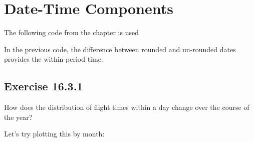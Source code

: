 \documentclass[]{book}
\newenvironment{Shaded}{\begin{snugshade}}{\end{snugshade}}
\newcommand{\DataTypeTok}[1]{\textcolor[rgb]{0.13,0.29,0.53}{#1}}
\newcommand{\DecValTok}[1]{\textcolor[rgb]{0.00,0.00,0.81}{#1}}
\newcommand{\KeywordTok}[1]{\textcolor[rgb]{0.13,0.29,0.53}{\textbf{#1}}}
\newcommand{\NormalTok}[1]{#1}
\newcommand{\OperatorTok}[1]{\textcolor[rgb]{0.81,0.36,0.00}{\textbf{#1}}}
\newcommand{\OtherTok}[1]{\textcolor[rgb]{0.56,0.35,0.01}{#1}}
\newcommand{\StringTok}[1]{\textcolor[rgb]{0.31,0.60,0.02}{#1}}
\theoremstyle{plain}
\theoremstyle{remark}
\theoremstyle{definition}
\theoremstyle{definition}
\theoremstyle{definition}
\theoremstyle{remark}
\begin{document}
\hypertarget{date-time-components}{%
\section{Date-Time Components}\label{date-time-components}}

The following code from the chapter is used

\begin{Shaded}
\end{Shaded}

In the previous code, the difference between rounded and un-rounded
dates provides the within-period time.

\hypertarget{exercise-16.3.1}{%
\subsection*{\texorpdfstring{Exercise
{16.3.1}}{Exercise 16.3.1}}\label{exercise-16.3.1}}

How does the distribution of flight times within a day change over the
course of the year?

Let's try plotting this by month:

\begin{Shaded}
\end{Shaded}
\end{document}
